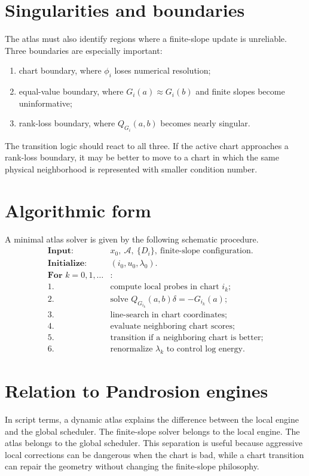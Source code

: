 \documentclass[11pt]{article}
\begin{document}
\section{Singularities and boundaries}
The atlas must also identify regions where a finite-slope update is unreliable.  Three boundaries are especially important:
\begin{enumerate}[leftmargin=2em]
\item chart boundary, where $\phi_i$ loses numerical resolution;
\item equal-value boundary, where $G_i(a)\approx G_i(b)$ and finite slopes become uninformative;
\item rank-loss boundary, where $Q_{G_i}(a,b)$ becomes nearly singular.
\end{enumerate}
The transition logic should react to all three.  If the active chart approaches a rank-loss boundary, it may be better to move to a chart in which the same physical neighborhood is represented with smaller condition number.

\section{Algorithmic form}
A minimal atlas solver is given by the following schematic procedure.
\[
\begin{array}{ll}
\textbf{Input:} & x_0,\ \mathcal A,\ \{D_i\},\ \text{finite-slope configuration}.\\
\textbf{Initialize:} & (i_0,u_0,\lambda_0).\\
\textbf{For } k=0,1,\ldots &: \\
1. & \text{compute local probes in chart } i_k;\\
2. & \text{solve } Q_{G_{i_k}}(a,b)\delta=-G_{i_k}(a);\\
3. & \text{line-search in chart coordinates;}\\
4. & \text{evaluate neighboring chart scores;}\\
5. & \text{transition if a neighboring chart is better;}\\
6. & \text{renormalize } \lambda_k \text{ to control log energy.}
\end{array}
\]

\section{Relation to Pandrosion engines}
In script terms, a dynamic atlas explains the difference between the local engine and the global scheduler.  The finite-slope solver belongs to the local engine.  The atlas belongs to the global scheduler.  This separation is useful because aggressive local corrections can be dangerous when the chart is bad, while a chart transition can repair the geometry without changing the finite-slope philosophy.
\end{document}

